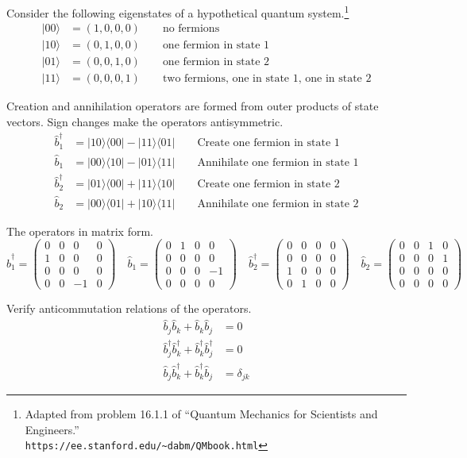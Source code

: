 \documentclass[12pt]{article}
\begin{document}
\noindent
Consider the following eigenstates of a hypothetical quantum system.\footnote{
Adapted from problem 16.1.1 of ``Quantum Mechanics for Scientists and Engineers.''\\
{\tt https://ee.stanford.edu/{\textasciitilde}dabm/QMbook.html}}
\begin{align*}
|00\rangle&=(1,0,0,0)\qquad\text{no fermions}\\
|10\rangle&=(0,1,0,0)\qquad\text{one fermion in state 1}\\
|01\rangle&=(0,0,1,0)\qquad\text{one fermion in state 2}\\
|11\rangle&=(0,0,0,1)\qquad\text{two fermions, one in state 1, one in state 2}
\end{align*}

\noindent
Creation and annihilation operators are formed from outer products of state vectors.
Sign changes make the operators antisymmetric.
\begin{align*}
\hat{b}_1^\dag&=|10\rangle\langle00|-|11\rangle\langle01| \qquad\text{Create one fermion in state 1}
\\
\hat{b}_1&=|00\rangle\langle10|-|01\rangle\langle11| \qquad\text{Annihilate one fermion in state 1}
\\
\hat{b}_2^\dag&=|01\rangle\langle00|+|11\rangle\langle10| \qquad\text{Create one fermion in state 2}
\\
\hat{b}_2&=|00\rangle\langle01|+|10\rangle\langle11| \qquad\text{Annihilate one fermion in state 2}
\end{align*}

\noindent
The operators in matrix form.
\begin{equation*}
\hat{b}_1^\dag=\begin{pmatrix}0&0&0&0\\1&0&0&0\\0&0&0&0\\0&0&-1&0\end{pmatrix}
\quad
\hat{b}_1=\begin{pmatrix}0&1&0&0\\0&0&0&0\\0&0&0&-1\\0&0&0&0\end{pmatrix}
\quad
\hat{b}_2^\dag=\begin{pmatrix}0&0&0&0\\0&0&0&0\\1&0&0&0\\0&1&0&0\end{pmatrix}
\quad
\hat{b}_2=\begin{pmatrix}0&0&1&0\\0&0&0&1\\0&0&0&0\\0&0&0&0\end{pmatrix}
\end{equation*}

\noindent
Verify anticommutation relations of the operators.
\begin{align*}
\hat{b}_j\hat{b}_k+\hat{b}_k\hat{b}_j&=0
\\[2ex]
\hat{b}_j^\dag\hat{b}_k^\dag+\hat{b}_k^\dag\hat{b}_j^\dag&=0
\\[2ex]
\hat{b}_j\hat{b}_k^\dag+\hat{b}_k^\dag\hat{b}_j&=\delta_{jk}
\end{align*}
\end{document}
